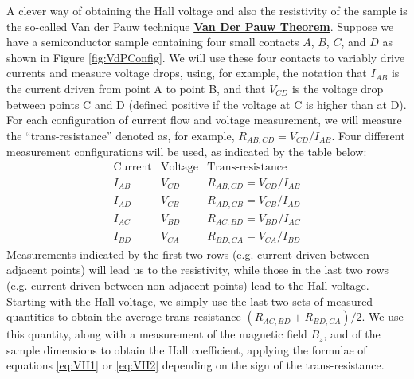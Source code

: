 \documentclass{../lab}
\newcommand{\VanDerPauwTheorem}{http://experimentationlab.berkeley.edu/node/105}
\begin{document}
A clever way of obtaining the Hall voltage and also the resistivity of the sample is the so-called Van der Pauw technique \href{\VanDerPauwTheorem}{\textbf{Van Der Pauw Theorem}}. Suppose we have a semiconductor sample containing four small contacts $A$, $B$, $C$, and $D$ as shown in Figure \ref{fig:VdPConfig}. We will use these four contacts to variably drive currents and measure voltage drops, using, for example, the notation that $I_{AB}$ is the current driven from point A to point B, and that $V_{CD}$ is the voltage drop between points C and D (defined positive if the voltage at C is higher than at D). For each configuration of current flow and voltage measurement, we will measure the ``trans-resistance'' denoted as, for example, $R_{AB,CD} = V_{CD} / I_{AB}$. Four different measurement configurations will be used, as indicated by the table below:
\[
\begin{array}{c|c|c}
\textrm{Current} & \textrm{Voltage} & \textrm{Trans-resistance} \\
\hline
I_{AB} & V_{CD} & R_{AB,CD} = V_{CD} / I_{AB} \\
I_{AD} & V_{CB} & R_{AD,CB} = V_{CB} / I_{AD} \\
I_{AC} & V_{BD} & R_{AC,BD} = V_{BD} / I_{AC} \\
I_{BD} & V_{CA} & R_{BD,CA} = V_{CA} / I_{BD}
\end{array}
\]
Measurements indicated by the first two rows (e.g. current driven between adjacent points) will lead us to the resistivity, while those in the last two rows (e.g. current driven between non-adjacent points) lead to the Hall voltage. Starting with the Hall voltage, we simply use the last two sets of measured quantities to obtain the average trans-resistance $(R_{AC,BD} + R_{BD,CA}) / 2$. We use this quantity, along with a measurement of the magnetic field $B_z$, and of the sample dimensions to obtain the Hall coefficient, applying the formulae of equations \ref{eq:VH1} or \ref{eq:VH2} depending on the sign of the trans-resistance.
\end{document}
